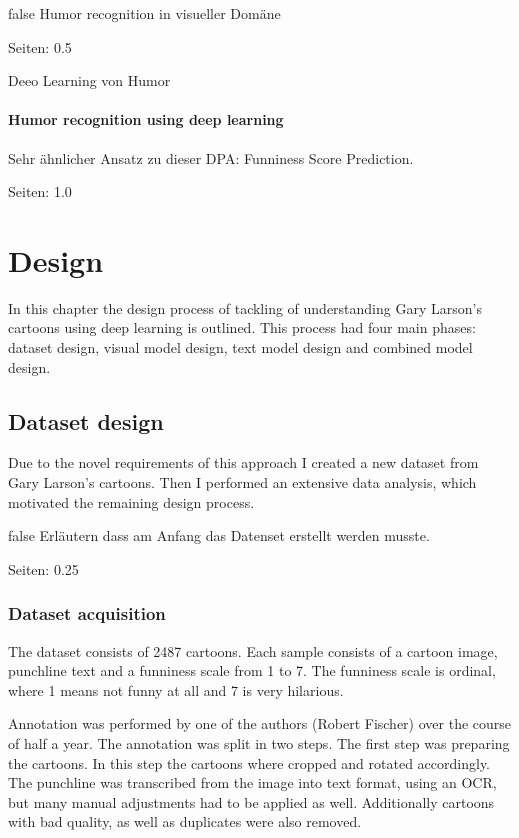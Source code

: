 \documentclass[draft,final,oneside]{vutinfth} %
\begin{document}
\if false
Humor recognition in visueller Domäne

\cite{chen2017convolutional}

Seiten: 0.5


Deeo Learning von Humor 

\cite{chen2018humor}



\subsubsection{Humor recognition using deep learning}

Sehr ähnlicher Ansatz zu dieser DPA: Funniness Score Prediction.

\cite{chiruzzo2019overview}

Seiten: 1.0
\fi

\chapter{Design} \label{design}

In this chapter the design process of tackling of understanding Gary Larson's cartoons using deep learning is outlined. This process had four main phases: dataset design, visual model design, text model design and combined model design.

\section{Dataset design}

Due to the novel requirements of this approach I created a new dataset from Gary Larson's cartoons. Then I performed an extensive data analysis, which motivated the remaining design process.

\if false
Erläutern dass am Anfang das Datenset erstellt werden musste.

Seiten: 0.25
\fi

\subsection{Dataset acquisition}
The dataset consists of 2487 cartoons. Each sample consists of a cartoon image, punchline text and a funniness scale from 1 to 7. The funniness scale is ordinal, where 1 means not funny at all and 7 is very hilarious.

Annotation was performed by one of the authors (Robert Fischer) over the course of half a year. The annotation was split in two steps. The first step was preparing the cartoons. In this step the cartoons where cropped and rotated accordingly. The punchline was transcribed from the image into text format, using an OCR, but many manual adjustments had to be applied as well. Additionally cartoons with bad quality, as well as duplicates were also removed.
\end{document}
